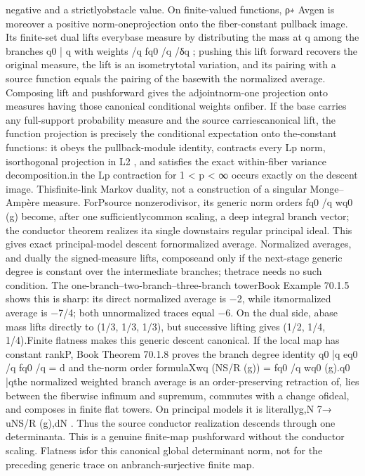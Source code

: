\documentclass[11pt]{article}
\begin{document}
\begin{GrantData}
{negative and a strictly\npositive obstacle value. On ﬁnite-valued functions, ρ∗ Avgen is moreover a positive norm-one\nidempotent projection onto the ﬁber-constant pullback image. Its ﬁnite-set dual lifts every\nsigned base measure by distributing the mass at q among the branches q0 | q with weights /q fq0 /q /δq ; pushing this lift forward recovers the original measure, the lift is an isometry\nfor total variation, and its pairing with a source function equals the pairing of the base\nmeasure with the normalized average. Composing lift and pushforward gives the adjoint\npositive norm-one projection onto measures having those canonical conditional weights on\neach ﬁber. If the base carries any full-support probability measure and the source carries\nits canonical lift, the function projection is precisely the conditional expectation onto the-constant functions: it obeys the pullback-module identity, contracts every Lp norm, is\nthe orthogonal projection in L2 , and satisﬁes the exact within-ﬁber variance decomposition.\nEquality in the Lp contraction for 1 < p < ∞ occurs exactly on the descent image. This\nis ﬁnite-link Markov duality, not a construction of a singular Monge–Ampère measure. For\n                                                        P\na source nonzerodivisor, its generic norm orders           fq0 /q wq0 (g) become, after one suﬃciently\ndivisible common scaling, a deep integral branch vector; the conductor theorem realizes it\nby a single downstairs regular principal ideal. This gives exact principal-model descent for\nthe normalized average. Normalized averages, and dually the signed-measure lifts, compose\nif and only if the next-stage generic degree is constant over the intermediate branches; the\nunnormalized trace needs no such condition. The one-branch–two-branch–three-branch tower\nin Book Example 70.1.5 shows this is sharp: its direct normalized average is −2, while its\niterated normalized average is −7/4; both unnormalized traces equal −6. On the dual side, a\nunit base mass lifts directly to (1/3, 1/3, 1/3), but successive lifting gives (1/2, 1/4, 1/4).\n     Finite ﬂatness makes this generic descent canonical. If the local map has constant rank\n                                                                          P\nd, Book Theorem 70.1.8 proves the branch degree identity                    q0 |q eq0 /q fq0 /q = d and the\ndeterminant-norm order formula\n                                                           X\n                                    wq (NS/R (g)) =                fq0 /q wq0 (g).\n                                                           q0 |q\n\nConsequently the normalized weighted branch average is an order-preserving retraction of\npullback, lies between the ﬁberwise inﬁmum and supremum, commutes with a change of\nnormalizing ideal, and composes in ﬁnite ﬂat towers. On principal models it is literally\n g,N 7→ uNS/R (g),dN . Thus the source conductor realization descends through one determinant\nuaS      a\n\n\n{}\n\nnorm. This is a genuine ﬁnite-map pushforward without the conductor scaling. Flatness is\nused for this canonical global determinant norm, not for the preceding generic trace on an\narbitrary branch-surjective ﬁnite map.\n }
\end{GrantData}
\end{document}
